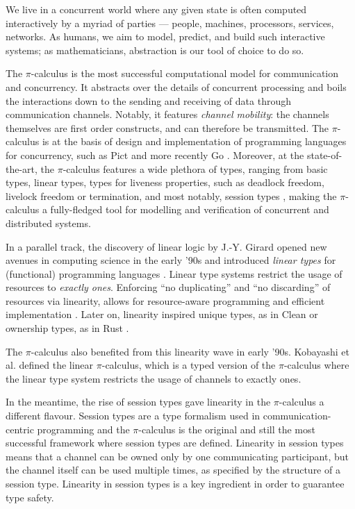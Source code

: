 \documentclass[a4paper,UKenglish,cleveref, autoref, thm-restate,authorcolumns]{lipics-v2019}
\theoremstyle{definition}
\newcommand{\picalc}{$\pi$-calculus}
\begin{document}
We live in a concurrent world where any given state is often computed interactively by a myriad of parties --- people, machines, processors, services, networks.
As humans, we aim to model, predict, and build such interactive systems; as mathematicians, abstraction is our tool of choice to do so.

The \picalc{} \cite{MilnerPW92,Milner99} is the most successful computational model for communication and concurrency.
It abstracts over the details of concurrent processing and boils the interactions down to the sending and receiving of data through communication channels.
Notably, it features \emph{channel mobility}: the channels themselves are first order constructs, and can therefore be transmitted.
The \picalc{} is at the basis of design and implementation of programming languages for concurrency, such as Pict \cite{Pierce} and more recently Go \cite{Golang}.
Moreover, at the state-of-the-art, the \picalc{} features a wide plethora of types, ranging from basic types, linear types, types for liveness properties, such as deadlock freedom, livelock freedom or termination, and most notably, session types \cite{K07}, making the \picalc{} a fully-fledged tool for modelling and verification of concurrent and distributed systems.

In a parallel track, the discovery of linear logic by J.-Y. Girard \cite{Girard87} opened new avenues in computing science in the early '90s and introduced \emph{linear types} for (functional) programming languages \cite{Curry-Howard,Wadler90,Bernardy2018}.
Linear type systems restrict the usage of resources to \emph{exactly ones}.
Enforcing ``no duplicating'' and ``no discarding'' of resources via linearity, allows for resource-aware programming and efficient implementation \cite{Wadler90}.
Later on, linearity inspired unique types, as in Clean \cite{BarendsenS96} or ownership types, as in Rust \cite{MatsakisK14}.

The \picalc{} also benefited from this linearity wave in early '90s.
Kobayashi et al. \cite{KPT96} defined the {linear} \picalc{}, which is a typed version of the \picalc{} where the linear type system restricts the usage of channels to {exactly ones}.

In the meantime, the rise of session types \cite{H93,THK94,HVK98} gave linearity in the \picalc{} a different flavour.
Session types are a type formalism used in communication-centric programming and the \picalc{} is the original and still
the most successful framework where session types are defined.
Linearity in session types means that a channel can be owned only by one communicating participant, but the channel itself can be used multiple times, as specified by the structure of a session type.
Linearity in session types is a key ingredient in order to guarantee type safety.
\end{document}

